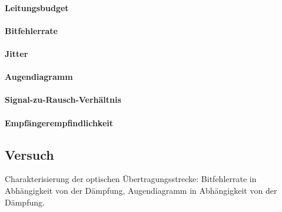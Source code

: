 \documentclass[a4paper]{article}
\begin{document}
\paragraph{Leitungsbudget}
\paragraph{Bitfehlerrate}
\paragraph{Jitter}
\paragraph{Augendiagramm}
\paragraph{Signal-zu-Rausch-Verhältnis}
\paragraph{Empfängerempfindlichkeit}

\subsection{Versuch}
Charakterisierung der optischen Übertragungsstrecke:
Bitfehlerrate in Abhängigkeit von der Dämpfung,
Augendiagramm in Abhängigkeit von der Dämpfung.
\end{document}
